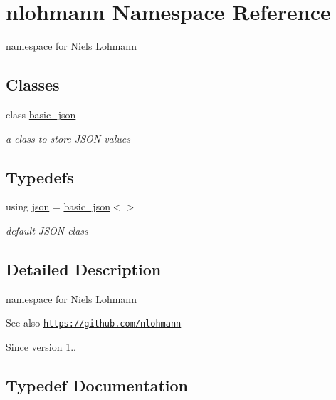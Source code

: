 \hypertarget{namespacenlohmann}{}\section{nlohmann Namespace Reference}
\label{namespacenlohmann}


namespace for Niels Lohmann  


\subsection*{Classes}
\begin{DoxyCompactItemize}
\item 
class \hyperlink{classnlohmann_1_1basic__json}{basic\+\_\+json}
\begin{DoxyCompactList}\small\item\em a class to store J\+S\+O\+N values \end{DoxyCompactList}\end{DoxyCompactItemize}
\subsection*{Typedefs}
\begin{DoxyCompactItemize}
\item 
using \hyperlink{namespacenlohmann_a2bfd99e845a2e5cd90aeaf1b1431f474}{json} = \hyperlink{classnlohmann_1_1basic__json}{basic\+\_\+json}$<$$>$
\begin{DoxyCompactList}\small\item\em default J\+S\+O\+N class \end{DoxyCompactList}\end{DoxyCompactItemize}


\subsection{Detailed Description}
namespace for Niels Lohmann 

\begin{DoxySeeAlso}{See also}
\href{https://github.com/nlohmann}{\tt https\+://github.\+com/nlohmann} 
\end{DoxySeeAlso}
\begin{DoxySince}{Since}
version 1.. 
\end{DoxySince}


\subsection{Typedef Documentation}
\hypertarget{namespacenlohmann_a2bfd99e845a2e5cd90aeaf1b1431f474}{}

